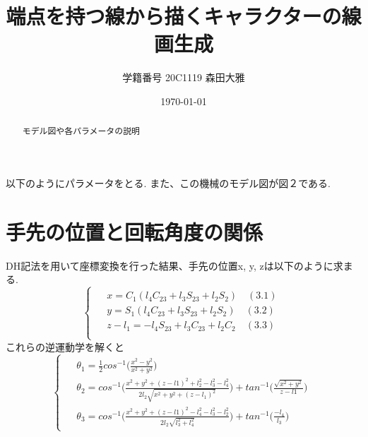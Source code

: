 \documentclass[a4j]{jarticle}			%
\title{端点を持つ線から描くキャラクターの線画生成}
\author{学籍番号 20C1119 森田大雅}
\date{\today}
\begin{document}
\maketitle %
\small


\begin{abstract}
モデル図や各パラメータの説明
\end{abstract}




\begin{multicols}{2} %


以下のようにパラメータをとる. また、この機械のモデル図が図２である.

\small
\section{手先の位置と回転角度の関係}
DH記法を用いて座標変換を行った結果、手先の位置x, y, zは以下のように求まる.
\begin{equation*}
	\left\{
		\begin{array}{c}
		\begin{split}
			&x=C_1(l_4C_{23}+l_3S_{23}+l_2S_2)\quad(3.1) \\
			&y=S_1(l_4C_{23}+l_3S_{23}+l_2S_2)\quad(3.2) \\
			&z-l_1=-l_4S_{23}+l_3C_{23}+l_2C_2\quad(3.3) \\
		\end{split}
	\end{array}
	\right.
\end{equation*}
これらの逆運動学を解くと
\tiny
\begin{equation*}
\left\{
	\begin{array}{c}
	\begin{split}
		&\theta_1=\frac{1}{2}cos^{-1}\biggl( \frac{x^2-y^2}{x^2+y^2} \biggr) \\
		&\theta_2= cos^{-1}\biggl( \frac{x^2+y^2+(z-l1)^2+l_2^2-l_3^2-l_4^2}{2l_2\sqrt{x^2+y^2+(z-l_1)^2}} \biggr)+tan^{-1}\biggl( \frac{\sqrt{x^2+y^2}}{z-l1}\biggr) \\
		&\theta_3=cos^{-1}\biggl( \frac{x^2+y^2+(z-l1)^2-l_4^2-l_3^2-l_2^2}{2l_2\sqrt{l_3^2+l_4^2}}\biggr)+tan^{-1}\biggl( \frac{-l_4}{l_3}\biggr)
	\end{split}
	\end{array}
\right.
\end{equation*}
\small

\end{multicols}
\end{document}
